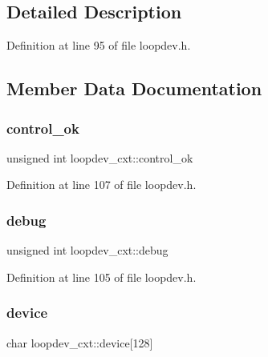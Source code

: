 \subsection{Detailed Description}


Definition at line 95 of file loopdev.\+h.



\subsection{Member Data Documentation}
\mbox{\label{structloopdev__cxt_ae529a309ccc0b8d814f2cee17e55d14f}} 
\subsubsection{\texorpdfstring{control\+\_\+ok}{control\_ok}}
{\footnotesize\ttfamily unsigned int loopdev\+\_\+cxt\+::control\+\_\+ok}



Definition at line 107 of file loopdev.\+h.

\mbox{\label{structloopdev__cxt_a21c01f73a14af97b3d0de37d98207273}} 
\subsubsection{\texorpdfstring{debug}{debug}}
{\footnotesize\ttfamily unsigned int loopdev\+\_\+cxt\+::debug}



Definition at line 105 of file loopdev.\+h.

\mbox{\label{structloopdev__cxt_a25b65fcc29dace037a522bf7ffc76071}} 
\subsubsection{\texorpdfstring{device}{device}}
{\footnotesize\ttfamily char loopdev\+\_\+cxt\+::device\mbox{[}128\mbox{]}}



